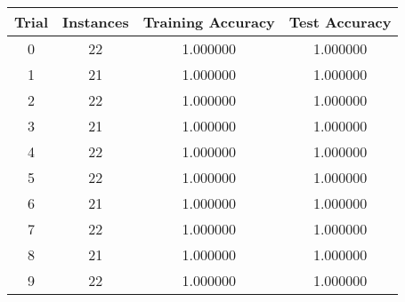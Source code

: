 {\footnotesize
\begin{tabular}{ c | c | c | c }
Trial & Instances & Training Accuracy & Test Accuracy \\
\hline
0 & 22 & 1.000000 & 1.000000 \\
1 & 21 & 1.000000 & 1.000000 \\
2 & 22 & 1.000000 & 1.000000 \\
3 & 21 & 1.000000 & 1.000000 \\
4 & 22 & 1.000000 & 1.000000 \\
5 & 22 & 1.000000 & 1.000000 \\
6 & 21 & 1.000000 & 1.000000 \\
7 & 22 & 1.000000 & 1.000000 \\
8 & 21 & 1.000000 & 1.000000 \\
9 & 22 & 1.000000 & 1.000000 \\
\end{tabular}
}
